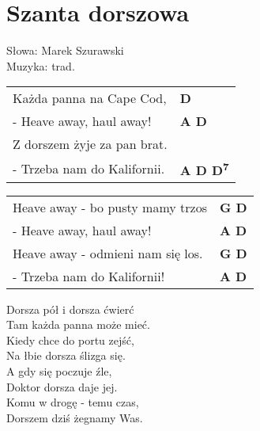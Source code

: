 \section{Szanta dorszowa}

Słowa: Marek Szurawski\\
Muzyka: trad.

\vspace{2em}
\begin{tabular}{@{}p{7cm}@{}l@{}}
Każda panna na Cape Cod, & \bfseries D\\
- Heave away, haul away! & \bfseries A D\\
Z dorszem żyje za pan brat.\\
- Trzeba nam do Kalifornii. & \bfseries A D D\textsuperscript{7}\\
\end{tabular}

\vspace{2em}
\begin{tabular}{@{}p{7cm}@{}l@{}}
Heave away - bo pusty mamy trzos & \bfseries G D\\
- Heave away, haul away! & \bfseries A D\\
Heave away - odmieni nam się los. & \bfseries G D\\
- Trzeba nam do Kalifornii! & \bfseries A D\\
\end{tabular}

\vspace{1em}
Dorsza pół i dorsza ćwierć \\
Tam każda panna może mieć. \\

Kiedy chce do portu zejść, \\
Na łbie dorsza ślizga się. \\

A gdy się poczuje źle, \\
Doktor dorsza daje jej. \\

Komu w drogę - temu czas, \\
Dorszem dziś żegnamy Was. 